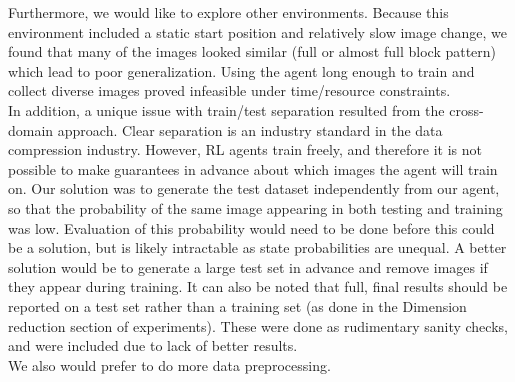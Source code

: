 Furthermore, we would like to explore other environments. Because this
environment included a static start position and relatively slow image change,
we found that many of the images looked similar (full or almost full block
pattern) which lead to poor generalization. Using the agent long enough to train
and collect diverse images proved infeasible under time/resource constraints.\\
In addition, a unique issue with train/test separation resulted from the
cross-domain approach. Clear separation is an industry standard in the data
compression industry. However, RL agents train freely, and therefore it is not
possible to make guarantees in advance about which images the agent will train
on. Our solution was to generate the test dataset independently from our agent,
so that the probability of the same image appearing in both testing and training
was low. Evaluation of this probability would need to be done before this could
be a solution, but is likely intractable as state probabilities are unequal. A
better solution would be to generate a large test set in advance and remove
images if they appear during training. It can also be noted that full, final
results should be reported on a test set rather than a training set (as done in
the Dimension reduction section of experiments). These were done as rudimentary
sanity checks, and were included due to lack of better results.\\
We also would prefer to do more data preprocessing.
